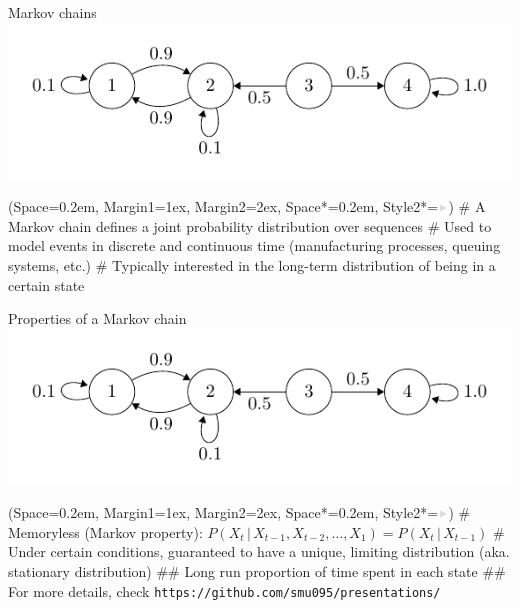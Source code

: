 \documentclass[12pt, aspectratio=149]{beamer}
\newcommand{\listSpace}{0.2em}
\theoremstyle{plain}
\begin{document}
\begin{frame}[fragile]{Markov chains}
	\includegraphics[scale=.8]{figs/irreducible.pdf}
	\begin{easylist}
		\ListProperties(Space=\listSpace, Margin1=1ex, Margin2=2ex, Space*=\listSpace, Style2*=$\color{bggraydark}\blacktriangleright$\space)
		# A Markov chain defines a joint probability distribution over sequences
		# Used to model events in discrete and continuous time (manufacturing processes, queuing systems, etc.)
		# Typically interested in the long-term distribution of being in a certain state
	\end{easylist}
\end{frame}

\begin{frame}[fragile]{Properties of a Markov chain}
	\includegraphics[scale=.8]{figs/irreducible.pdf}
	\begin{easylist}
		\ListProperties(Space=\listSpace, Margin1=1ex, Margin2=2ex, Space*=\listSpace, Style2*=$\color{bggraydark}\blacktriangleright$\space)
		# Memoryless (Markov property): $P(X_t\,|\,X_{t-1}, X_{t-2}, \ldots, X_1) = P(X_t\,|\,X_{t-1})$
		# Under certain conditions, guaranteed to have a unique, limiting distribution (aka. stationary distribution)
		## Long run proportion of time spent in each state
		## For more details, check \footnotesize\texttt{https://github.com/smu095/presentations/}
	\end{easylist}
\end{frame}
\end{document}
